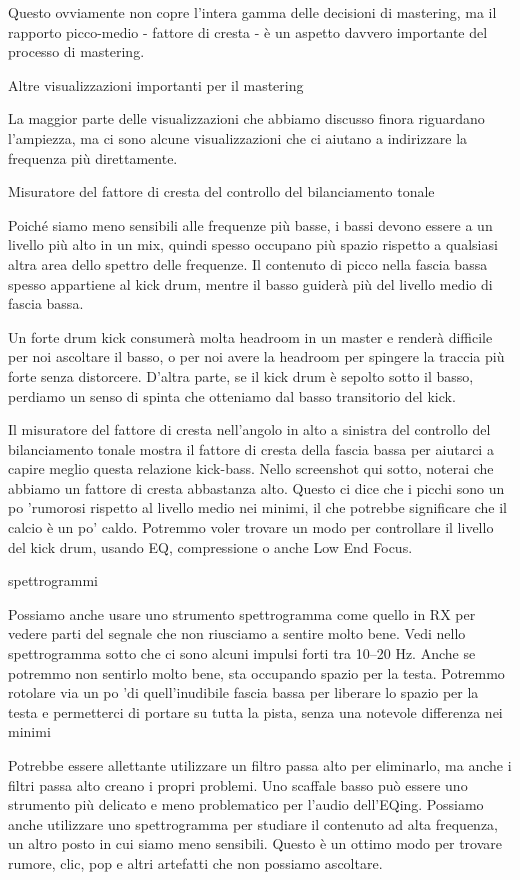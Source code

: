 Questo ovviamente non copre l'intera gamma delle decisioni di mastering, ma il
rapporto picco-medio - fattore di cresta - è un aspetto davvero importante del
processo di mastering.

Altre visualizzazioni importanti per il mastering

La maggior parte delle visualizzazioni che abbiamo discusso finora riguardano
l'ampiezza, ma ci sono alcune visualizzazioni che ci aiutano a indirizzare la
frequenza più direttamente.

Misuratore del fattore di cresta del controllo del bilanciamento tonale

Poiché siamo meno sensibili alle frequenze più basse, i bassi devono essere a un
livello più alto in un mix, quindi spesso occupano più spazio rispetto a qualsiasi
altra area dello spettro delle frequenze. Il contenuto di picco nella fascia bassa
spesso appartiene al kick drum, mentre il basso guiderà più del livello medio di
fascia bassa.

Un forte drum kick consumerà molta headroom in un master e renderà difficile per
noi ascoltare il basso, o per noi avere la headroom per spingere la traccia più
forte senza distorcere. D'altra parte, se il kick drum è sepolto sotto il basso,
perdiamo un senso di spinta che otteniamo dal basso transitorio del kick.

Il misuratore del fattore di cresta nell'angolo in alto a sinistra del controllo
del bilanciamento tonale mostra il fattore di cresta della fascia bassa per
aiutarci a capire meglio questa relazione kick-bass. Nello screenshot qui sotto,
noterai che abbiamo un fattore di cresta abbastanza alto. Questo ci dice che i
picchi sono un po 'rumorosi rispetto al livello medio nei minimi, il che potrebbe
significare che il calcio è un po' caldo. Potremmo voler trovare un modo per
controllare il livello del kick drum, usando EQ, compressione o anche Low End
Focus.

spettrogrammi

Possiamo anche usare uno strumento spettrogramma come quello in RX per vedere
parti del segnale che non riusciamo a sentire molto bene. Vedi nello spettrogramma
sotto che ci sono alcuni impulsi forti tra 10–20 Hz. Anche se potremmo non
sentirlo molto bene, sta occupando spazio per la testa. Potremmo rotolare via un
po 'di quell'inudibile fascia bassa per liberare lo spazio per la testa e
permetterci di portare su tutta la pista, senza una notevole differenza nei minimi

Potrebbe essere allettante utilizzare un filtro passa alto per eliminarlo, ma
anche i filtri passa alto creano i propri problemi. Uno scaffale basso può essere
uno strumento più delicato e meno problematico per l'audio dell'EQing. Possiamo
anche utilizzare uno spettrogramma per studiare il contenuto ad alta frequenza,
un altro posto in cui siamo meno sensibili. Questo è un ottimo modo per trovare
rumore, clic, pop e altri artefatti che non possiamo ascoltare.

